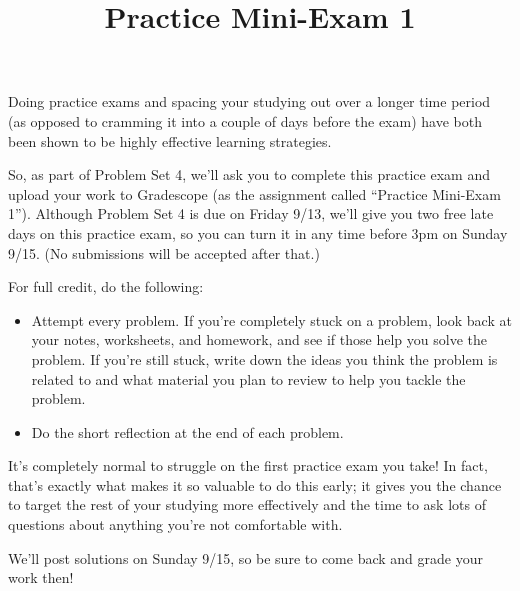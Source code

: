 \documentclass{article}
\newcommand{\checkbox}{\framebox[4mm]{\rule{0mm}{2mm}}}
\theoremstyle{theorem}
\begin{document}
  \begin{problemonly}
    Doing practice exams and spacing your studying out over a longer time period (as opposed to cramming it into a couple of days before the exam) have both been shown to be highly effective learning strategies.

    So, as part of Problem Set 4, we'll ask you to complete this practice exam and upload your work to Gradescope (as the assignment called ``Practice Mini-Exam 1''). Although Problem Set 4 is due on Friday 9/13, we'll give you two free late days on this practice exam, so you can turn it in any time before 3pm on Sunday 9/15. (No submissions will be accepted after that.) 

    For full credit, do the following: 
    \begin{itemize}[label=\checkbox]
    \item Attempt every problem. If you're completely stuck on a problem, look back at your notes, worksheets, and homework, and see if those help you solve the problem. If you're still stuck, write down the ideas you think the problem is related to and what material you plan to review to help you tackle the problem.

    \item Do the short reflection at the end of each problem.

    \end{itemize}
    It's completely normal to struggle on the first practice exam you take! In fact, that's exactly what makes it so valuable to do this early; it gives you the chance to target the rest of your studying more effectively and the time to ask lots of questions about anything you're not comfortable with.

    We'll post solutions on Sunday 9/15, so be sure to come back and grade your work then!

     \newpage
  \end{problemonly}

  \title{Practice Mini-Exam 1}


\listofproblems
\end{document}
